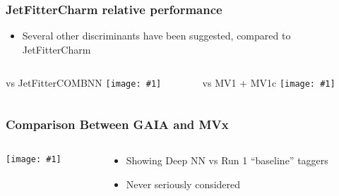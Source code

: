 \documentclass[usenames,dvipsnames]{beamer}
\newcommand{\widegraphic}[1]{\texttt{[image: \#1]}}
\begin{document}
\begin{frame}
  \frametitle{JetFitterCharm relative performance}
  \begin{itemize}
  \item Several other discriminants have been suggested, compared to JetFitterCharm
  \end{itemize}
  \begin{columns}
    \begin{column}{0.5\textwidth}
      \begin{center}
        vs JetFitterCOMBNN
      \widegraphic{figures/external/ctag-2d-jfc-vs-jfit.pdf}
      \end{center}
    \end{column}
    \begin{column}{0.5\textwidth}
      \begin{center}
        vs MV1 + MV1c
      \widegraphic{figures/external/ctag-2d-jfc-vs-mv.pdf}
      \end{center}
    \end{column}
  \end{columns}
\end{frame}


\begin{frame}
  \frametitle{Comparison Between GAIA and MVx}
  \begin{columns}
    \begin{column}{0.5\textwidth}
      \widegraphic{figures/external/ctag-2d-gaia-vs-mv.pdf}
    \end{column}
    \begin{column}{0.5\textwidth}
      \begin{itemize}
      \item Showing Deep NN vs Run 1 ``baseline'' taggers
      \item Never seriously considered
      \end{itemize}
    \end{column}
  \end{columns}
\end{frame}
\end{document}
